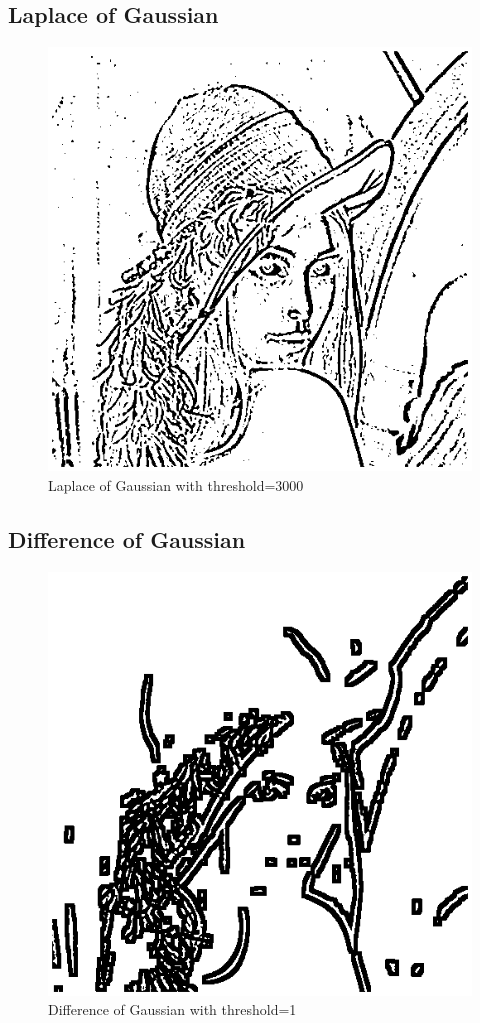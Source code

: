 \documentclass{article}
\begin{document}
\subsection{Laplace of Gaussian}
\begin{figure}[H]
  \includegraphics[width=\linewidth]{img/laplacian_of_gaussian.png}
  \caption{Laplace of Gaussian with threshold=3000}
  \label{fig:laplacian_of_gaussian}
\end{figure}

\subsection{Difference of Gaussian}
\begin{figure}[H]
  \includegraphics[width=\linewidth]{img/diff_of_gaussian.png}
  \caption{Difference of Gaussian with threshold=1}
  \label{fig:diff_of_gaussian}
\end{figure}
\end{document}
